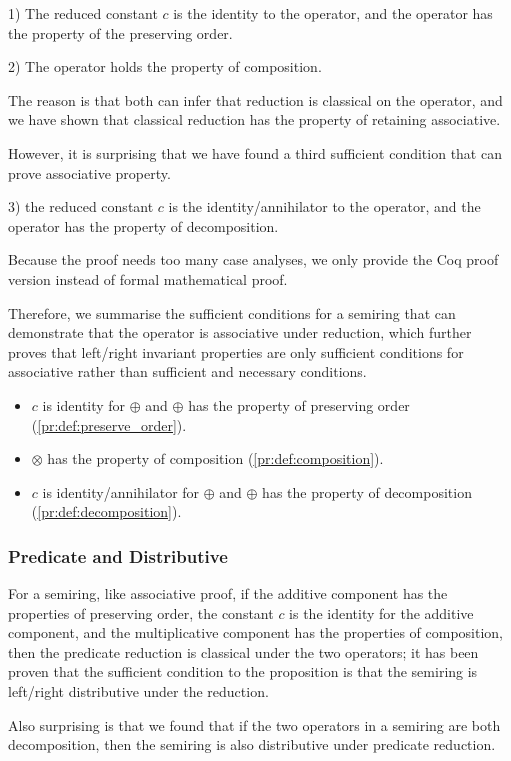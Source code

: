 \documentclass[a4paper,12pt,twoside,openright]{report}
\begin{document}
1) The reduced constant $c$ is the identity to the operator, and the operator has the property of the preserving order.

2) The operator holds the property of composition.

The reason is that both can infer that reduction is classical on the operator, and we have shown that classical reduction has the property of retaining associative.

However, it is surprising that we have found a third sufficient condition that can prove associative property.

3) the reduced constant $c$ is the identity/annihilator to the operator, and the operator has the property of decomposition.

Because the proof needs too many case analyses, we only provide the Coq proof version instead of formal mathematical proof.

Therefore, we summarise the sufficient conditions for a semiring that can demonstrate that the operator is associative under reduction, which further proves that left/right invariant properties are only sufficient conditions for associative rather than sufficient and necessary conditions.
\begin{itemize}
  \item $c$ is identity for $\oplus$ and $\oplus$ has the property of preserving order (\ref{pr:def:preserve_order}).
  \item $\otimes$ has the property of composition (\ref{pr:def:composition}).
  \item $c$ is identity/annihilator for $\oplus$ and $\oplus$ has the property of decomposition (\ref{pr:def:decomposition}).
\end{itemize}
\subsubsection{Predicate and Distributive}
For a semiring, like associative proof, if the additive component has the properties of preserving order, the constant $c$ is the identity for the additive component, and the multiplicative component has the properties of composition, then the predicate reduction is classical under the two operators; it has been proven that the sufficient condition to the proposition is that the semiring is left/right distributive under the reduction. 

Also surprising is that we found that if the two operators in a semiring are both decomposition, then the semiring is also distributive under predicate reduction.
\end{document}

